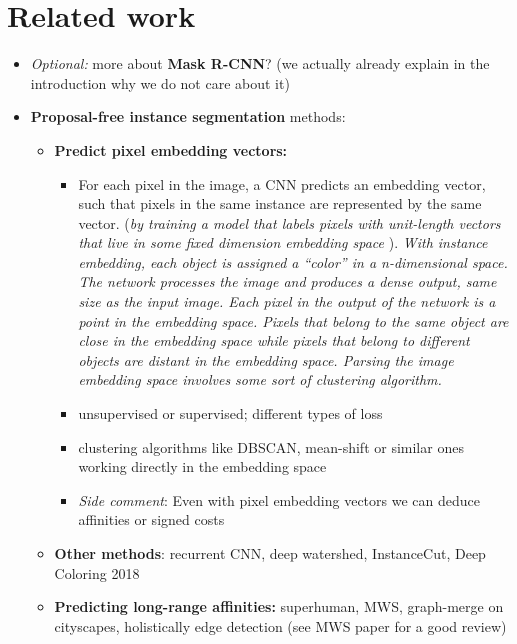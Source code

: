 \section{Related work}
\begin{itemize}
\item \textit{Optional:} more about \textbf{Mask R-CNN}? (we actually already explain in the introduction why we do not care about it)
\item \textbf{Proposal-free instance segmentation} methods:
\begin{itemize}
\item \textbf{Predict pixel embedding vectors:} 
\begin{itemize}
\item For each pixel in the image, a CNN predicts an embedding vector, such that pixels in the same instance are represented by the same vector. (\textit{by training a model that labels pixels with unit-length vectors that live in some ﬁxed dimension embedding space}  ). \textit{With instance embedding, each object is assigned a “color” in a n-dimensional space. The network processes the image and produces a dense output, same size as the input image. Each pixel in the output of the network is a point in the embedding space. Pixels that belong to the same object are close in the embedding space while pixels that belong to different objects are distant in the embedding space. Parsing the image embedding space involves some sort of clustering algorithm.}  
\item unsupervised or supervised; different types of loss 
\item clustering algorithms like DBSCAN, mean-shift or similar ones working directly in the embedding space  
\item \textit{Side comment}: Even with pixel embedding vectors we can deduce affinities or signed costs
\end{itemize}
\item \textbf{Other methods}: recurrent CNN, deep watershed, InstanceCut, Deep Coloring 2018 
\item \textbf{Predicting long-range affinities:} superhuman, MWS, graph-merge on cityscapes, holistically edge detection (see MWS paper for a good review) 
\end{itemize}


\end{itemize}
